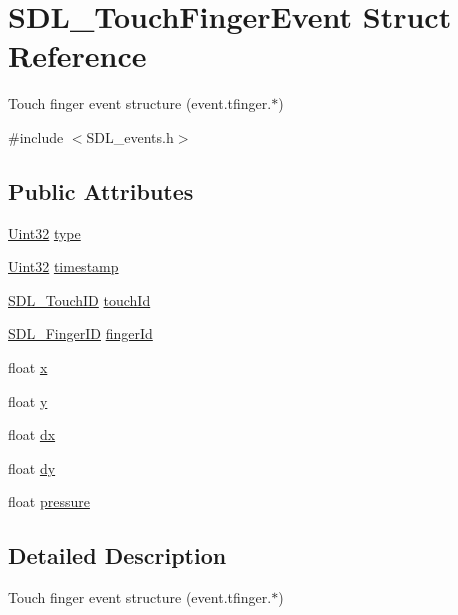 \hypertarget{struct_s_d_l___touch_finger_event}{}\section{S\+D\+L\+\_\+\+Touch\+Finger\+Event Struct Reference}
\label{struct_s_d_l___touch_finger_event}


Touch finger event structure (event.\+tfinger.$\ast$)  




{\ttfamily \#include $<$S\+D\+L\+\_\+events.\+h$>$}

\subsection*{Public Attributes}
\begin{DoxyCompactItemize}
\item 
\hyperlink{_s_d_l__stdinc_8h_add440eff171ea5f55cb00c4a9ab8672d}{Uint32} \hyperlink{struct_s_d_l___touch_finger_event_a3883218fa3426065ca66086c100edbfa}{type}
\item 
\hyperlink{_s_d_l__stdinc_8h_add440eff171ea5f55cb00c4a9ab8672d}{Uint32} \hyperlink{struct_s_d_l___touch_finger_event_abde2ab5cb013bbd21e37a65e2f8fa666}{timestamp}
\item 
\hyperlink{_s_d_l__touch_8h_a10f5f86abe4ea8308a8706bd5d3b337a}{S\+D\+L\+\_\+\+Touch\+ID} \hyperlink{struct_s_d_l___touch_finger_event_ad7a6f39ec9af1bf47b160d18314edd70}{touch\+Id}
\item 
\hyperlink{_s_d_l__touch_8h_a5fa58141f78415ca09645af359ad2250}{S\+D\+L\+\_\+\+Finger\+ID} \hyperlink{struct_s_d_l___touch_finger_event_a8616d46ed19906e3ee90a4d481d3a284}{finger\+Id}
\item 
float \hyperlink{struct_s_d_l___touch_finger_event_a0ce44b1342220fa17e9b9b4a77c2c906}{x}
\item 
float \hyperlink{struct_s_d_l___touch_finger_event_ac2bb8af638d2927a8e13f6ffe8f9384e}{y}
\item 
float \hyperlink{struct_s_d_l___touch_finger_event_ac6acac209d6e2bd659fdb6760081393d}{dx}
\item 
float \hyperlink{struct_s_d_l___touch_finger_event_a9c0320c5f18a6b9d10da657e166608c9}{dy}
\item 
float \hyperlink{struct_s_d_l___touch_finger_event_ab4fca822d0807b5748dbae8d3cc56524}{pressure}
\end{DoxyCompactItemize}


\subsection{Detailed Description}
Touch finger event structure (event.\+tfinger.$\ast$) 

